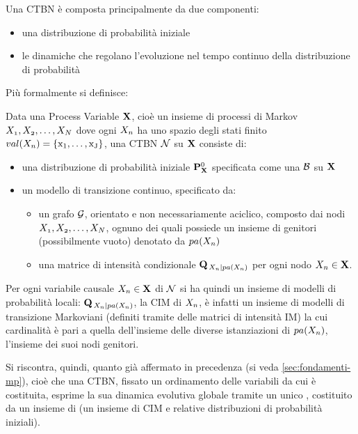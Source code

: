 Una \acs{CTBN} è composta principalmente da due componenti:
\begin{itemize}
    \item una distribuzione di probabilità iniziale
    \item le dinamiche che regolano l'evoluzione nel tempo continuo della distribuzione di probabilità
\end{itemize}
Più formalmente si definisce:
\begin{definizione}
\label{defn:ctbn}
Data una Process Variable $\mathbf{X}$, cioè un insieme di processi di Markov $\mathnormal{X_1}, \mathnormal{X_2}, \dotsc, \mathnormal{X_N}$ dove ogni $\mathnormal{X_n}$ ha uno spazio degli stati finito $val(\mathnormal{X_n})=\{\mathrm{x_1}, \dotsc, \mathrm{x_J}\}$, una \acs{CTBN} $\mathcal{N}$ su $\mathbf{X}$ consiste di:
\begin{itemize}
    \item una distribuzione di probabilità iniziale $\mathbf{P}^0_{\mathbf{X}}$ specificata come una \bn{} $\mathcal{B}$ su $\mathbf{X}$
    \item un modello di transizione continuo, specificato da:
    \begin{itemize}
        \item un grafo $\mathcal{G}$, orientato e non necessariamente aciclico, composto dai nodi $\mathnormal{X_1}, \mathnormal{X_2}, \dotsc, \mathnormal{X_N}$, ognuno dei quali possiede un insieme di genitori (possibilmente vuoto) denotato da $pa(\mathnormal{X_n})$
        \item una matrice di intensità condizionale $\mathbf{Q}_{\,\mathnormal{X_n}|pa(\mathnormal{X_n})}$ per ogni nodo $\mathnormal{X_n} \in \mathbf{X}$.
    \end{itemize}
\end{itemize}
\end{definizione}

Per ogni variabile causale $\mathnormal{X_n} \in \mathbf{X}$ di $\mathcal{N}$ si ha quindi un insieme di modelli di probabilità locali: $\mathbf{Q}_{\,\mathnormal{X_n}|pa(\mathnormal{X_n})}$, la \acs{CIM} di $\mathnormal{X_n}$, è infatti un insieme di modelli di transizione Markoviani (definiti tramite delle matrici di intensità \acs{IM}) la cui cardinalità è pari a quella dell'insieme delle diverse istanziazioni di $pa(\mathnormal{X_n})$, l'insieme dei suoi nodi genitori.

Si riscontra, quindi, quanto già affermato in precedenza (si veda \ref{sec:fondamenti-mp}), cioè che una \acs{CTBN}, fissato un ordinamento delle variabili da cui è costituita, esprime la sua dinamica evolutiva globale tramite un unico \homm\mprocess, costituito da un insieme di \conm\mprocess{} (un insieme di \acs{CIM} e relative distribuzioni di probabilità iniziali).

